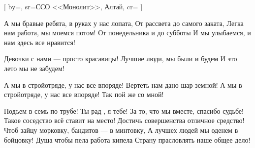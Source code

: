 [
  by={},
  sr={ССО <<Монолит>>, Алтай},
  cr={}
  ]




\beginverse
А мы бравые ребята, в руках у нас лопата,
От рассвета до самого заката,
Легка нам работа, мы моемся потом!
От понедельника и до субботы 
И мы улыбаемся, и нам здесь все нравится!

Девочки с нами --- просто красавицы! 
Лучшие люди, мы были и будем
И это лето мы не забудем!
\endverse


\beginchorus
А мы в стройотряде, у нас все впоряде!
Вертеть нам дано шар земной!
А мы в стройотряде, у нас все впоряде!
Так пой же со мной!
\endchorus


\beginverse
Подъем в семь по трубе!
Ты рад , я тебе!
За то, что мы вместе, спасибо судьбе!
Такое соседство всё ставит на место!
Достичь совершенства отличное средство!
Чтоб зайцу морковку, бандитов --- в минтовку,
А лучшех людей мы оденем в бойцовку!
Душа чтобы пела работа кипела 
Страну прасловлять наше общее дело!
\endverse


\endsong
